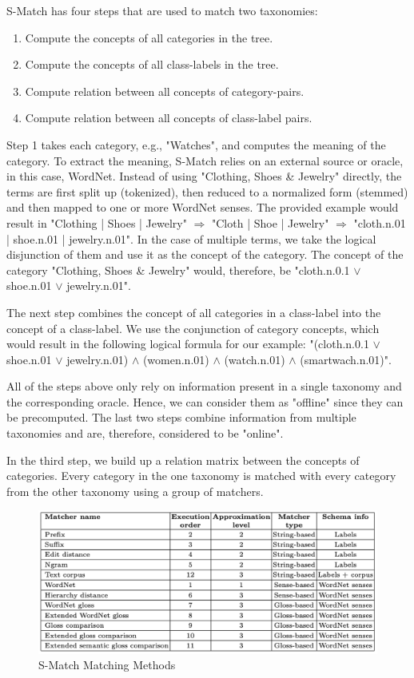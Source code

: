 S-Match has four steps that are used to match two taxonomies:
\begin{enumerate}
    \item Compute the concepts of all categories in the tree.
    \item Compute the concepts of all class-labels in the tree.
    \item Compute relation between all concepts of category-pairs.
    \item Compute relation between all concepts of class-label pairs.
\end{enumerate}

Step 1 takes each category, e.g., "Watches", and computes the meaning of the category.
To extract the meaning, S-Match relies on an external source or oracle, in this case, WordNet.
Instead of using "Clothing, Shoes \& Jewelry" directly, the terms are first split up
(tokenized), then reduced to a normalized form (stemmed) and then mapped to one
or more WordNet senses.
The provided example would result in "Clothing | Shoes | Jewelry" $\Rightarrow$ "Cloth | Shoe | Jewelry"
$\Rightarrow$ "cloth.n.01 | shoe.n.01 | jewelry.n.01".
In the case of multiple terms, we take the logical disjunction of them and use it as the concept of the category.
The concept of the category "Clothing, Shoes \& Jewelry" would, therefore, be "cloth.n.0.1 $\vee$ shoe.n.01 $\vee$ jewelry.n.01".

The next step combines the concept of all categories in a class-label into the concept of a class-label.
We use the conjunction of category concepts, which would result in the following logical formula for our example:
"(cloth.n.0.1 $\vee$ shoe.n.01 $\vee$ jewelry.n.01) $\wedge$ (women.n.01) $\wedge$ (watch.n.01) $\wedge$ (smartwach.n.01)".

All of the steps above only rely on information present in a single taxonomy and the corresponding oracle.
Hence, we can consider them as "offline" since they can be precomputed.
The last two steps combine information from multiple taxonomies and are, therefore, considered to be "online".

In the third step, we build up a relation matrix between the concepts of categories.
Every category in the one taxonomy is matched with every category from the other taxonomy using a group of matchers.
\begin{figure}[!htbp]
    \centering
    \includegraphics[width=13cm]{images/smatch-matchers.png}
    \caption[S-Match Matching Methods]{S-Match Matching Methods\protect~\cite{giunchiglia2005semantic}}
    \label{fig:smatch-matchers}
\end{figure}

